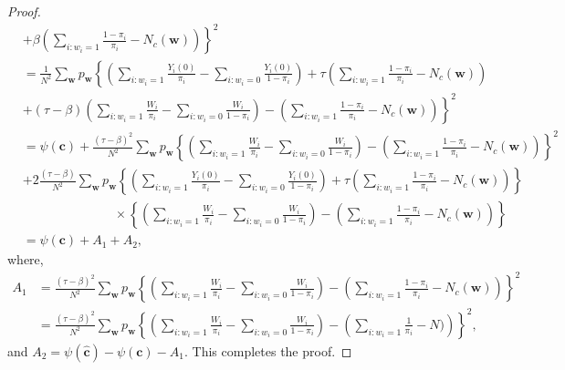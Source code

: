 \documentclass[10pt,a4paper]{amsart}
\begin{document}
\begin{proof}
\begin{align}
    &+ \left. \beta \left(\sum_{i:w_i = 1}\frac{1-\pi_i}{\pi_i} - N_c(\bm{w}) \right)\right\}^2 \nonumber \\
    & = \frac{1}{N^2} \sum_{\bm{w}}p_{\bm{w}} \left\{ \left(\sum_{i:w_i = 1}\frac{Y_i(0)}{\pi_i} - \sum_{i:w_i = 0}\frac{Y_i(0)}{1-\pi_i} \right) + \tau \left( \sum_{i:w_i = 1}\frac{1-\pi_i}{\pi_i} - N_c(\bm{w}) \right) \right. \nonumber \\
 & + \left. (\tau - \beta) \left(\sum_{i:w_i = 1}\frac{W_i}{\pi_i} - \sum_{i:w_i = 0}\frac{W_i}{1-\pi_i}\right) - \left(\sum_{i:w_i = 1}\frac{1-\pi_i}{\pi_i} - N_c(\bm{w}) \right)\right\}^2 \nonumber \\
 & = \psi(\bm{c}) + \frac{(\tau - \beta)^2}{N^2}\sum_{\bm{w}}p_{\bm{w}}\left\{\left(\sum_{i:w_i = 1}\frac{W_i}{\pi_i} - \sum_{i:w_i = 0}\frac{W_i}{1-\pi_i}\right) - \left(\sum_{i:w_i = 1}\frac{1-\pi_i}{\pi_i} - N_c(\bm{w}) \right)\right\}^2 \nonumber \\
 & + 2\frac{(\tau - \beta)}{N^2}\sum_{\bm{w}}p_{\bm{w}}\left\{ \left(\sum_{i:w_i = 1}\frac{Y_i(0)}{\pi_i} - \sum_{i:w_i = 0}\frac{Y_i(0)}{1-\pi_i} \right) + \tau \left( \sum_{i:w_i = 1}\frac{1-\pi_i}{\pi_i} - N_c(\bm{w}) \right) \right\} \nonumber \\
 & \hspace{3cm} \times \left\{\left(\sum_{i:w_i = 1}\frac{W_i}{\pi_i} - \sum_{i:w_i = 0}\frac{W_i}{1-\pi_i}\right) - \left(\sum_{i:w_i = 1}\frac{1-\pi_i}{\pi_i} - N_c(\bm{w}) \right)\right\} \nonumber \\
 & = \psi(\bm{c}) + A_1 + A_2, \label{eq_A_impute3}
\end{align}
where,
\begin{align}
A_1 &=  \frac{(\tau - \beta)^2}{N^2}\sum_{\bm{w}}p_{\bm{w}}\left\{\left(\sum_{i:w_i = 1}\frac{W_i}{\pi_i} - \sum_{i:w_i = 0}\frac{W_i}{1-\pi_i}\right) - \left(\sum_{i:w_i = 1}\frac{1-\pi_i}{\pi_i} - N_c(\bm{w}) \right)\right\}^2    \nonumber \\
& = \frac{(\tau - \beta)^2}{N^2}\sum_{\bm{w}}p_{\bm{w}}\left\{\left(\sum_{i:w_i = 1}\frac{W_i}{\pi_i} - \sum_{i:w_i = 0}\frac{W_i}{1-\pi_i}\right) - \left(\sum_{i:w_i = 1}\frac{1}{\pi_i} - N) \right)\right\}^2,
\end{align}
and $A_2 = \psi(\hat{\bm{c}}) -\psi(\bm{c}) - A_1$. 
This completes the proof.
\end{proof}
\end{document}
